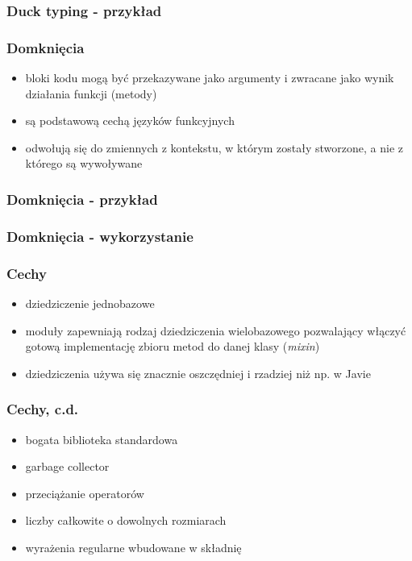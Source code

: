 \documentclass[12t]{beamer}
\begin{document}
\begin{frame}
  \frametitle{Duck typing - przykład}
 \begin{small}
    
  \end{small}
\end{frame}

\begin{frame}
  \frametitle{Domknięcia}
  \begin{itemize}
  \item bloki kodu mogą być przekazywane jako argumenty i zwracane
    jako wynik działania funkcji (metody)
  \item są podstawową cechą języków funkcyjnych
  \item odwołują się do zmiennych z kontekstu, w którym zostały
    stworzone, a nie z którego są wywoływane
  \end{itemize}
\end{frame}

\begin{frame}
  \frametitle{Domknięcia - przykład}
  
\end{frame}

\begin{frame}
  \frametitle{Domknięcia - wykorzystanie}
  
\end{frame}

\begin{frame}
  \frametitle{Cechy}
  \begin{itemize}
  \item dziedziczenie jednobazowe
  \item moduły zapewniają rodzaj dziedziczenia wielobazowego
    pozwalający włączyć gotową implementację zbioru metod do danej
    klasy (\emph{mixin})
  \item dziedziczenia używa się znacznie oszczędniej i rzadziej niż
    np. w Javie
  \end{itemize}
\end{frame}

\begin{frame}
  \frametitle{Cechy, c.d.}
  \begin{itemize}
  \item bogata biblioteka standardowa
  \item garbage collector
  \item przeciążanie operatorów
  \item liczby całkowite o dowolnych rozmiarach
  \item wyrażenia regularne wbudowane w składnię
  \end{itemize}
\end{frame}
\end{document}
